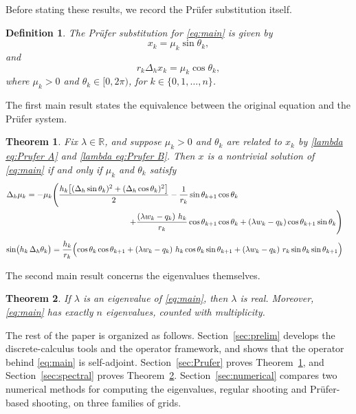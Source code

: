 \documentclass[12pt,reqno]{amsart}
\newtheorem{thm}{Theorem}[section]
\newtheorem{definition}{Definition}[section]
\numberwithin{equation}{section}
\begin{document}
Before stating these results, we record the Pr\"ufer substitution itself.
\begin{definition}
    The \emph{Pr\"ufer substitution} for \eqref{eq:main} is given by
    \begin{equation}
x_k=\mu_k\sin\theta_k,\label{lambda eq:Prufer A}
    \end{equation} 
    and
    \begin{equation}
    r_k\Delta_hx_k=\mu_k\cos\theta_k, \label{lambda eq:Prufer B} 
    \end{equation}
    where $\mu_k>0$ and $\theta_k \in [0, 2 \pi)$, for $k \in \{0,1, \ldots,n\}$.
\end{definition}

The first main result states the equivalence between the original equation and the Pr\"ufer system.
\begin{thm}\label{thm:prufer}
Fix $\lambda \in \mathbb{R}$, and suppose $\mu_k > 0$ and $\theta_k$ are related to
$x_k$ by \eqref{lambda eq:Prufer A} and \eqref{lambda eq:Prufer B}. Then $x$ is a
nontrivial solution of \eqref{eq:main} if and only if $\mu_k$ and $\theta_k$ satisfy
\begin{align}
\Delta_h\mu_k = -\mu_k\Bigg(\frac{h_k\bigl[(\Delta_h\sin\theta_k)^2 + (\Delta_h\cos\theta_k)^2\bigr]}{2}-\frac{1}{r_k}\sin\theta_{k+1}\cos\theta_k\notag\\
+
\frac{\left(\lambda w_k-q_k\right)\, h_k}{r_k}\cos\theta_{k+1}\cos\theta_{k}
&+ \left(\lambda w_k-q_k\right)\cos\theta_{k+1}\sin\theta_k\Bigg) \label{lambda eq:thmA}
\end{align}
\begin{align}
\label{lambda eq:thmB}
\sin\bigl(h_k\,\Delta_h\theta_k\bigr)
={}& \frac{h_k}{r_k}\Bigl(\cos\theta_k\cos\theta_{k+1}
+ \left(\lambda w_k-q_k\right)\,h_k\cos\theta_k\sin\theta_{k+1}+ \left(\lambda w_k-q_k\right)\,r_k\sin\theta_k\sin\theta_{k+1}\Bigr)
\end{align}
\end{thm}

The second main result concerns the eigenvalues themselves.
\begin{thm}\label{thm:spectral}
If $\lambda$ is an eigenvalue of \eqref{eq:main}, then $\lambda$ is real. Moreover, \eqref{eq:main} has exactly $n$ eigenvalues, counted with multiplicity.
\end{thm}

The rest of the paper is organized as follows. Section~\ref{sec:prelim} develops the discrete-calculus tools and the operator framework, and shows that the operator behind \eqref{eq:main} is self-adjoint. Section~\ref{sec:Prufer} proves Theorem~\ref{thm:prufer}, and Section~\ref{sec:spectral} proves Theorem~\ref{thm:spectral}. Section~\ref{sec:numerical} compares two numerical methods for computing the eigenvalues, regular shooting and Pr\"ufer-based shooting, on three families of grids.
\end{document}
